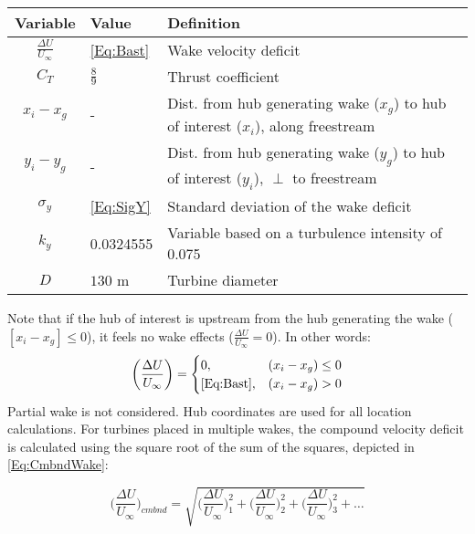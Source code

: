 \documentclass[12pt]{article}
\begin{document}
    \begin{table}[H]
        \centering
        \begin{tabular}{|c|l|l|}
            \hline
             Variable & Value & Definition \\ \hline
            $\frac{\Delta U}{U_{\infty}}$ & \cref{Eq:Bast} & Wake velocity deficit \\ \hline
            $C_T$ & $\frac{8}{9}$ & Thrust coefficient \\ \hline
            $x_{i}-x_{g}$ & - & Dist. from hub generating wake ($x_g$) to hub of interest ($x_i$), along freestream \\ \hline
            $y_{i}-y_{g}$ & - & Dist. from hub generating wake ($y_g$) to hub of interest ($y_i$), $\perp$ to freestream  \\ \hline
            $\sigma_y$ & \cref{Eq:SigY} & Standard deviation of the wake deficit \\ \hline
            $k_y$ & 0.0324555 & Variable based on a turbulence intensity of 0.075 \cite{Thomas2018, Niayifar2016} \\ \hline
            $D$ & $130$ m & Turbine diameter \cite{NREL335MW}\\ \hline
        \end{tabular}
    \end{table}
\vspace{-0.25cm}
    Note that if the hub of interest is upstream from the hub generating the wake ($[x_i - x_g] \leq 0$), it feels no wake effects ($\frac{\Delta U}{U_{\infty}} = 0$). In other words:
    \newline
    \begin{equation*}
        \left(\frac{\Delta U}{U_{\infty}}\right) =
        \begin{cases}
            0, & (x_i - x_g) \leq 0 \\
            \cref{Eq:Bast}, & (x_i - x_g) > 0 \\
        \end{cases}
    \end{equation*}
    \newline
    Partial wake is not considered. Hub coordinates are used for all location calculations. For turbines placed in multiple wakes, the compound velocity deficit is calculated using the square root of the sum of the squares, depicted in \cref{Eq:CmbndWake}:
    
    \begin{equation}
    \label{Eq:CmbndWake}
        \bigg(\frac{\Delta U}{U_{\infty}}\bigg)_{cmbnd} = 
            \sqrt{
                \bigg(\frac{\Delta U}{U_{\infty}}\bigg)_{1}^{2} +
                \bigg(\frac{\Delta U}{U_{\infty}}\bigg)_{2}^{2} +
                \bigg(\frac{\Delta U}{U_{\infty}}\bigg)_{3}^{2} +
                \dots}
    \end{equation}



\end{document}
